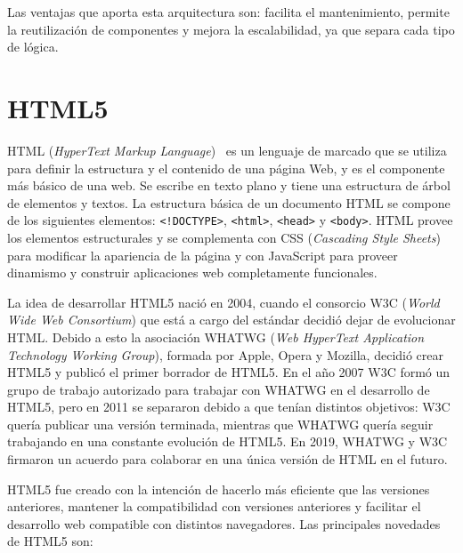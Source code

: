 \documentclass[a4paper, 12pt]{book}
\begin{document}
Las ventajas que aporta esta arquitectura son: facilita el mantenimiento, permite la reutilización de componentes y mejora la escalabilidad, ya que separa cada tipo de lógica.

\section{HTML5} 
\label{sec:HTML5}

HTML (\emph{HyperText Markup Language})~\cite{Pagina_HTML, Historia_HTML5, gauchat2012gran} es un lenguaje de marcado que se utiliza para definir la estructura y el contenido de una página Web, y es el componente más básico de una web. 
Se escribe en texto plano y tiene una estructura de árbol de elementos y textos. 
La estructura básica de un documento HTML se compone de los siguientes elementos: \texttt{<!DOCTYPE>}, \texttt{<html>}, \texttt{<head>} y \texttt{<body>}. 
HTML provee los elementos estructurales y se complementa con CSS (\emph{Cascading Style Sheets}) para modificar la apariencia de la página y con JavaScript para proveer dinamismo y construir aplicaciones web completamente funcionales. 

La idea de desarrollar HTML5 nació en 2004, cuando el consorcio W3C (\emph{World Wide Web Consortium}) que está a cargo del estándar decidió dejar de evolucionar HTML. Debido a esto la asociación WHATWG (\emph{Web HyperText Application Technology Working Group}), formada por Apple, Opera y Mozilla, decidió crear HTML5 y publicó el primer borrador de HTML5. 
En el año 2007 W3C formó un grupo de trabajo autorizado para trabajar con WHATWG en el desarrollo de HTML5, pero en 2011 se separaron debido a que tenían distintos objetivos: W3C quería publicar una versión terminada, mientras que WHATWG quería seguir trabajando en una constante evolución de HTML5. 
En 2019, WHATWG y W3C firmaron un acuerdo para colaborar en una única versión de HTML en el futuro.

HTML5 fue creado con la intención de hacerlo más eficiente que las versiones anteriores, mantener la compatibilidad con versiones anteriores y facilitar el desarrollo web compatible con distintos navegadores. Las principales novedades de HTML5 son:
\end{document}
